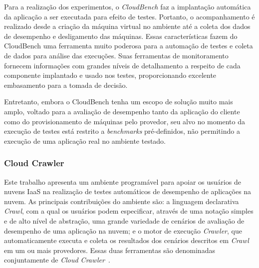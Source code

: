 Para a realização dos experimentos, o \textit{CloudBench} faz a implantação automática da aplicação a ser executada para efeito de testes. Portanto, o acompanhamento é realizado desde a criação da máquina virtual no ambiente até a coleta dos dados de desempenho e desligamento das máquinas. Essas características fazem do CloudBench uma ferramenta muito poderosa para a
automação de testes e coleta de dados para análise das execuções. Suas ferramentas
de monitoramento fornecem informações com grandes níveis de detalhamento a respeito
de cada componente implantado e usado nos testes, proporcionando excelente embasamento
para a tomada de decisão.

Entretanto, embora o CloudBench tenha um escopo de solução muito mais amplo, 
voltado para a avaliação de desempenho tanto da aplicação do cliente como do 
provisionamento de máquinas pelo provedor, seu alvo no momento da execução de 
testes está restrito a \textit{benchmarks} pré-definidos, não permitindo a execução de 
uma aplicação real no ambiente testado.


\subsubsection{Cloud Crawler}
Este trabalho apresenta um ambiente programável para apoiar os usuários de nuvens IaaS na realização de testes automáticos de desempenho de aplicações na nuvem. As principais contribuições do ambiente são: a linguagem declarativa {\em Crawl}, com a qual os usuários podem especificar, através de uma notação simples e de alto nível de abstração, uma grande variedade de cenários de avaliação de desempenho de uma aplicação na nuvem; e o motor de execução {\em Crawler}, que automaticamente executa e coleta os resultados dos cenários descritos em {\em Crawl} em um ou mais provedores. Essas duas ferramentas são denominadas conjuntamente de {\em Cloud Crawler}~\cite{cunhacloud,cunha2013b}.

